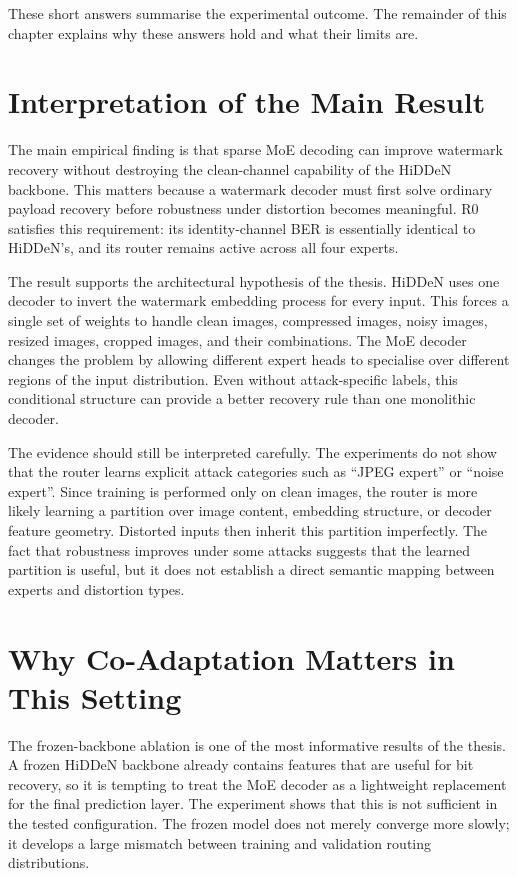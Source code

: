 ﻿\documentclass[12pt, a4paper, twoside]{report}
\numberwithin{equation}{chapter}
\begin{document}
These short answers summarise the experimental outcome. The remainder of this chapter explains why these answers hold and what their limits are.

\section{Interpretation of the Main Result}

The main empirical finding is that sparse MoE decoding can improve watermark recovery without destroying the clean-channel capability of the HiDDeN backbone. This matters because a watermark decoder must first solve ordinary payload recovery before robustness under distortion becomes meaningful. R0 satisfies this requirement: its identity-channel BER is essentially identical to HiDDeN's, and its router remains active across all four experts.

The result supports the architectural hypothesis of the thesis. HiDDeN uses one decoder to invert the watermark embedding process for every input. This forces a single set of weights to handle clean images, compressed images, noisy images, resized images, cropped images, and their combinations. The MoE decoder changes the problem by allowing different expert heads to specialise over different regions of the input distribution. Even without attack-specific labels, this conditional structure can provide a better recovery rule than one monolithic decoder.

The evidence should still be interpreted carefully. The experiments do not show that the router learns explicit attack categories such as ``JPEG expert'' or ``noise expert''. Since training is performed only on clean images, the router is more likely learning a partition over image content, embedding structure, or decoder feature geometry. Distorted inputs then inherit this partition imperfectly. The fact that robustness improves under some attacks suggests that the learned partition is useful, but it does not establish a direct semantic mapping between experts and distortion types.

\section{Why Co-Adaptation Matters in This Setting}

The frozen-backbone ablation is one of the most informative results of the thesis. A frozen HiDDeN backbone already contains features that are useful for bit recovery, so it is tempting to treat the MoE decoder as a lightweight replacement for the final prediction layer. The experiment shows that this is not sufficient in the tested configuration. The frozen model does not merely converge more slowly; it develops a large mismatch between training and validation routing distributions.
\end{document}
